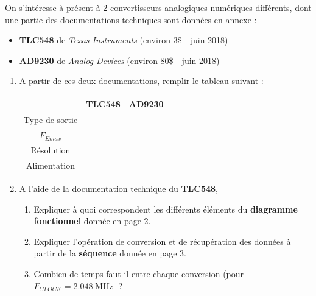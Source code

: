 

On s'intéresse à présent à 2 convertisseurs analogiques-numériques différents, dont une partie des documentations techniques sont données en annexe :
\begin{itemize}
	\item \textbf{TLC548} de \textit{Texas Instruments} (environ 3\$ - juin 2018)
	\item \textbf{AD9230} de \textit{Analog Devices} (environ 80\$ - juin 2018)
\end{itemize}

\begin{enumerate}
	\item A partir de ces deux documentations, remplir le tableau suivant :

\begin{tabular}{|c|p{3cm}|p{3cm}|}
\hline 
 & TLC548 & AD9230 \\ 
\hline 
Type de sortie &  &  \\ 
\hline 
$F_{Emax}$ &  &  \\ 
\hline 
Résolution &  &  \\ 
\hline 
Alimentation &  &  \\ 
\hline 
\end{tabular} 
	
	\item A l'aide de la documentation technique du \textbf{TLC548}, 
	\begin{enumerate}
		\item Expliquer à quoi correspondent les différents éléments du \textbf{diagramme fonctionnel} donnée en page 2.
		\item Expliquer l'opération de conversion et de récupération des données à partir de la \textbf{séquence} donnée en page 3.
		\item Combien de temps faut-il entre chaque conversion (pour $F_{CLOCK} = 2.048\operatorname{MHz}$ ?
	\end{enumerate}
	
\end{enumerate}



